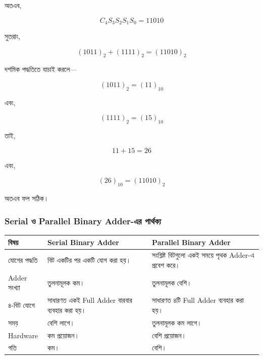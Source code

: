 \par\endgroup

অতএব,

\[
C_4S_3S_2S_1S_0=11010
\]

সুতরাং,

\[
\boxed{
(1011)_2+(1111)_2=(11010)_2
}
\]

দশমিক পদ্ধতিতে যাচাই করলে—

\[
(1011)_2=(11)_{10}
\]

এবং,

\[
(1111)_2=(15)_{10}
\]

তাই,

\[
11+15=26
\]

এবং,

\[
(26)_{10}=(11010)_2
\]

অতএব ফল সঠিক।



\subsubsection*{\textenglish{Serial} ও \textenglish{Parallel Binary Adder}-এর পার্থক্য}

\begin{center}

\renewcommand{\arraystretch}{1.25}

\begin{tabularx}
{\textwidth}
{|L{0.20\textwidth}|Y|Y|}

\hline


\textbf{বিষয়}
&
\textbf{\textenglish{Serial Binary Adder}}
&
\textbf{\textenglish{Parallel Binary Adder}}
\\
\hline

যোগের পদ্ধতি
&
বিট একটির পর একটি যোগ করা হয়।
&
সংশ্লিষ্ট বিটগুলো একই সময়ে পৃথক
\textenglish{Adder}-এ প্রবেশ করে।
\\
\hline

\textenglish{Adder} সংখ্যা
&
তুলনামূলক কম।
&
তুলনামূলক বেশি।
\\
\hline

৪-বিট যোগে
&
সাধারণত একই \textenglish{Full Adder} বারবার ব্যবহার করা হয়।
&
সাধারণত ৪টি \textenglish{Full Adder} ব্যবহার করা হয়।
\\
\hline

সময়
&
বেশি লাগে।
&
তুলনামূলক কম লাগে।
\\
\hline

\textenglish{Hardware}
&
কম প্রয়োজন।
&
বেশি প্রয়োজন।
\\
\hline

গতি
&
কম।
&
বেশি।
\\
\hline

\end{tabularx}

\end{center}


